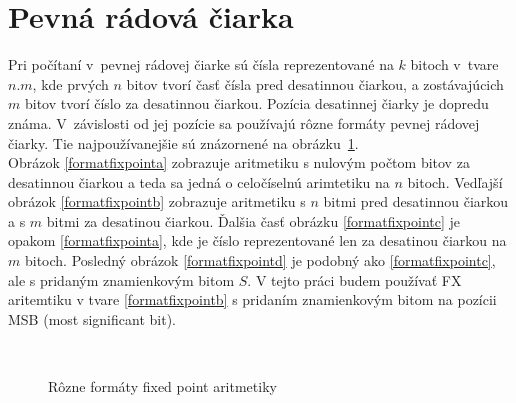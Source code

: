 \section{Pevná rádová čiarka}
Pri počítaní v~pevnej rádovej čiarke sú čísla reprezentované na $ k $ bitoch v~tvare $ n.m $, kde prvých $ n $ bitov tvorí časť čísla pred desatinnou čiarkou, a zostávajúcich $ m $ bitov tvorí číslo za desatinnou čiarkou. Pozícia desatinnej čiarky je dopredu známa. V~závislosti od jej pozície sa používajú rôzne formáty pevnej rádovej čiarky. Tie najpoužívanejšie sú znázornené na obrázku~\ref{formatfixpoint}. \\
Obrázok \ref{formatfixpointa} zobrazuje aritmetiku s nulovým počtom bitov za desatinnou čiarkou a teda sa jedná o celočíselnú arimtetiku na $ n $ bitoch. Vedľajší obrázok \ref{formatfixpointb} zobrazuje aritmetiku s $ n $ bitmi pred desatinnou čiarkou a s $ m $ bitmi za desatinou čiarkou. Ďalšia časť obrázku \ref{formatfixpointc} je opakom \ref{formatfixpointa}, kde je číslo reprezentované len za desatinou čiarkou na $ m $ bitoch. Posledný obrázok \ref{formatfixpointd} je podobný ako \ref{formatfixpointc}, ale s pridaným znamienkovým bitom $ S $.
V tejto práci budem používať FX aritemtiku v tvare \ref{formatfixpointb} s pridaním znamienkovým bitom na pozícii MSB (most significant bit).


\begin{figure}[h]
\centering
{} \hspace{0.6cm}
 \\ \bigskip
{} \hspace{1.2cm}
\caption{Rôzne formáty fixed point aritmetiky \cite{KrausDisP}}
\label{formatfixpoint}
\end{figure}
\bigskip

